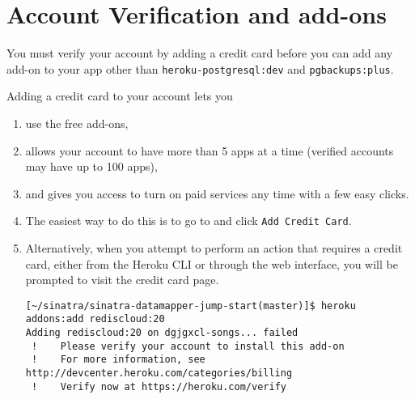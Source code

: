 \section{Account Verification and add-ons}
You must verify your account by adding a credit card before you can
add any add-on to your app other than \verb|heroku-postgresql:dev| and
\verb|pgbackups:plus|.

Adding a credit card to your account lets you 

\begin{enumerate}
\item 
use the free
add-ons, 
\item 
allows your account to have more than 5 apps at a time
(verified accounts may have up to 100 apps),
\item 
 and gives you access
to turn on paid services any time with a few easy clicks.
\item 
The easiest way to do this is to go to 
and click
\verb|Add Credit Card|. 
\item 
Alternatively, when you attempt to perform an
action that requires a credit card, either from the Heroku CLI or
through the web interface, you will be prompted to visit the credit
card page.
\begin{verbatim}
[~/sinatra/sinatra-datamapper-jump-start(master)]$ heroku addons:add rediscloud:20
Adding rediscloud:20 on dgjgxcl-songs... failed
 !    Please verify your account to install this add-on
 !    For more information, see http://devcenter.heroku.com/categories/billing
 !    Verify now at https://heroku.com/verify
\end{verbatim}
\end{enumerate}


